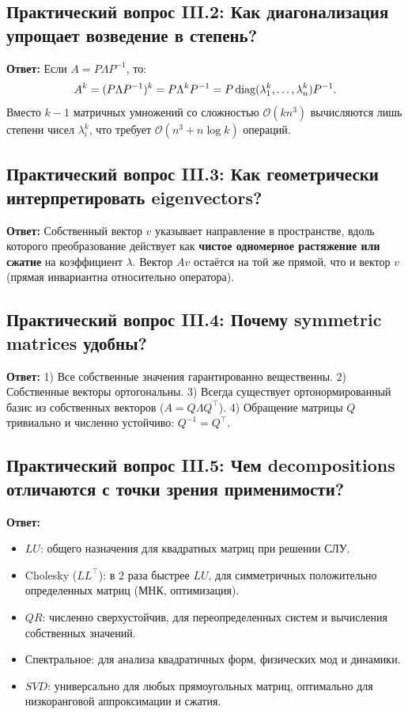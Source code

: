 \subsection{Практический вопрос III.2: Как диагонализация упрощает возведение в степень?}
\textbf{Ответ:} Если $A = P \Lambda P^{-1}$, то:
\[ A^k = (P \Lambda P^{-1})^k = P \Lambda^k P^{-1} = P \operatorname{diag}(\lambda_1^k, \dots, \lambda_n^k) P^{-1}. \]
Вместо $k - 1$ матричных умножений со сложностью $\mathcal{O}(k n^3)$ вычисляются лишь степени чисел $\lambda_i^k$, что
требует $\mathcal{O}(n^3 + n \log k)$ операций.

\subsection{Практический вопрос III.3: Как геометрически интерпретировать eigenvectors?}
\textbf{Ответ:} Собственный вектор $v$ указывает направление в пространстве, вдоль которого преобразование действует как
\textbf{чистое одномерное растяжение или сжатие} на коэффициент $\lambda$.
Вектор $Av$ остаётся на той же прямой, что и вектор $v$ (прямая инвариантна относительно оператора).

\subsection{Практический вопрос III.4: Почему symmetric matrices удобны?}
\textbf{Ответ:} 1) Все собственные значения гарантированно вещественны.
2) Собственные векторы ортогональны.
3) Всегда существует ортонормированный базис из собственных векторов ($A = Q \Lambda Q^\top$).
4) Обращение матрицы $Q$ тривиально и численно устойчиво: $Q^{-1} = Q^\top$.

\subsection{Практический вопрос III.5: Чем decompositions отличаются с точки зрения применимости?}
\textbf{Ответ:}
\begin{itemize}
    \item $LU$: общего назначения для квадратных матриц при решении СЛУ.
    \item Cholesky ($LL^\top$): в 2 раза быстрее $LU$, для симметричных положительно определенных матриц
    (МНК, оптимизация).
    \item $QR$: численно сверхустойчив, для переопределенных систем и вычисления собственных значений.
    \item Спектральное: для анализа квадратичных форм, физических мод и динамики.
    \item $SVD$: универсально для любых прямоугольных матриц, оптимально для низкоранговой аппроксимации и сжатия.
\end{itemize}

